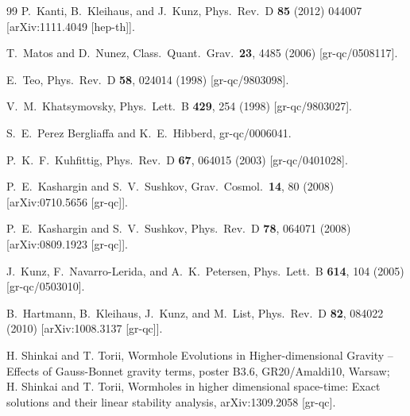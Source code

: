 \documentclass[showpacs,preprintnumbers,amsmath,amssymb,floatfix]{revtex4}
\begin{document}
\begin{thebibliography}{99}
  P.~Kanti, B.~Kleihaus, and J.~Kunz,
  Phys.\ Rev.\ D {\bf 85} (2012) 044007
%
  [arXiv:1111.4049 [hep-th]].


  T.~Matos and D.~Nunez,
  Class.\ Quant.\ Grav.\  {\bf 23}, 4485 (2006)
  [gr-qc/0508117].

  E.~Teo,
  Phys.\ Rev.\ D {\bf 58}, 024014 (1998)
  [gr-qc/9803098].

  V.~M.~Khatsymovsky,
  Phys.\ Lett.\ B {\bf 429}, 254 (1998)
  [gr-qc/9803027].

  S.~E.~Perez Bergliaffa and K.~E.~Hibberd,
  gr-qc/0006041.

  P.~K.~F.~Kuhfittig,
  Phys.\ Rev.\ D {\bf 67}, 064015 (2003)
  [gr-qc/0401028].

  P.~E.~Kashargin and S.~V.~Sushkov,
  Grav.\ Cosmol.\  {\bf 14}, 80 (2008)
  [arXiv:0710.5656 [gr-qc]].

  P.~E.~Kashargin and S.~V.~Sushkov,
  Phys.\ Rev.\ D {\bf 78}, 064071 (2008)
  [arXiv:0809.1923 [gr-qc]].

  J.~Kunz, F.~Navarro-Lerida, and A.~K.~Petersen,
  Phys.\ Lett.\ B {\bf 614}, 104 (2005)
  [gr-qc/0503010].

  B.~Hartmann, B.~Kleihaus, J.~Kunz, and M.~List,
  Phys.\ Rev.\ D {\bf 82}, 084022 (2010)
  [arXiv:1008.3137 [gr-qc]].

 H. Shinkai and T. Torii,
 Wormhole Evolutions in Higher-dimensional Gravity --
 Effects of Gauss-Bonnet gravity terms,
 poster B3.6, GR20/Amaldi10, Warsaw;\\
 H. Shinkai and T. Torii,
Wormholes in higher dimensional space-time: Exact solutions and their linear stability analysis,
  arXiv:1309.2058 [gr-qc].





\end{thebibliography}
\end{document}
